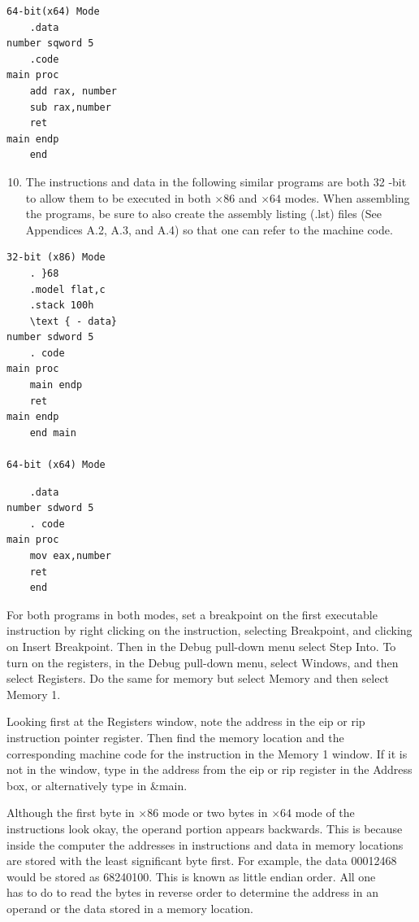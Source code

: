 \documentclass[10pt]{article}
\begin{document}
\begin{verbatim}
64-bit(x64) Mode
    .data
number sqword 5
    .code
main proc
    add rax, number
    sub rax,number
    ret
main endp
    end
\end{verbatim}

\begin{enumerate}
  \setcounter{enumi}{9}
  \item The instructions and data in the following similar programs are both 32 -bit to allow them to be executed in both $\times 86$ and $\times 64$ modes. When assembling the programs, be sure to also create the assembly listing (.lst) files (See Appendices A.2, A.3, and A.4) so that one can refer to the machine code.
\end{enumerate}

\begin{verbatim}
32-bit (x86) Mode
    . }68
    .model flat,c
    .stack 100h
    \text { - data}
number sdword 5
    . code
main proc
    main endp
    ret
main endp
    end main

64-bit (x64) Mode
\end{verbatim}

\begin{verbatim}
    .data
number sdword 5
    . code
main proc
    mov eax,number
    ret
    end
\end{verbatim}

For both programs in both modes, set a breakpoint on the first executable instruction by right clicking on the instruction, selecting Breakpoint, and clicking on Insert Breakpoint. Then in the Debug pull-down menu select Step Into. To turn on the registers, in the Debug pull-down menu, select Windows, and then select Registers. Do the same for memory but select Memory and then select Memory 1.

Looking first at the Registers window, note the address in the eip or rip instruction pointer register. Then find the memory location and the corresponding machine code for the instruction in the Memory 1 window. If it is not in the window, type in the address from the eip or rip register in the Address box, or alternatively type in \&main.

Although the first byte in $\times 86$ mode or two bytes in $\times 64$ mode of the instructions look okay, the operand portion appears backwards. This is because inside the computer the addresses in instructions and data in memory locations are stored with the least significant byte first. For example, the data 00012468 would be stored as 68240100. This is known as little endian order. All one\\
has to do to read the bytes in reverse order to determine the address in an operand or the data stored in a memory location.
\end{document}
